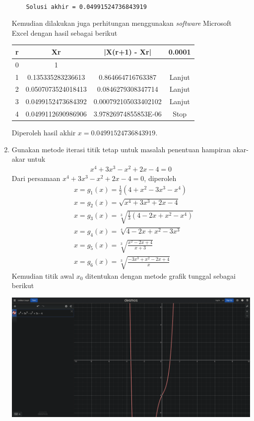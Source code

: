 \documentclass[12pt]{article}
\begin{document}
\begin{enumerate}
{\begin{lstlisting}
    
    Solusi akhir = 0.04991524736843919
        \end{lstlisting}
        Kemudian dilakukan juga perhitungan menggunakan \emph{software} Microsoft Excel dengan hasil sebagai berikut
        \begin{longtable}[c]{|c|c|c|c|}
            \hline
            r & Xr                 & |X(r+1) - Xr|        & 0.0001 \\ \hline
            \endfirsthead
            \endhead
            0 & 1                  &                      &        \\ \hline
            1 & 0.135335283236613  & 0.864664716763387    & Lanjut \\ \hline
            2 & 0.0507073524018413 & 0.0846279308347714   & Lanjut \\ \hline
            3 & 0.0499152473684392 & 0.000792105033402102 & Lanjut \\ \hline
            4 & 0.0499112690986906 & 3.97826974855853E-06 & Stop   \\ \hline
        \end{longtable}
        Diperoleh hasil akhir $ x = 0.04991524736843919 $.
    }
    \item {
        Gunakan metode iterasi titik tetap untuk masalah penentuan hampiran akar-akar untuk
        \begin{align*}
            x^4 + 3x^3 - x^2 + 2x - 4 = 0 
        \end{align*}
        Dari persamaan $ x^4 + 3x^3 - x^2 + 2x - 4 = 0 $, diperoleh
        \begin{align*}
            & x = g_1(x) = \frac{1}{2}(4 + x^2 - 3x^3 - x^4) \\
            & x = g_2(x) = \sqrt{x^4 + 3x^3 + 2x - 4} \\
            & x = g_3(x) = \sqrt[3]{\frac{1}{3}(4 - 2x + x^2 - x^4)} \\
            & x = g_4(x) = \sqrt[4]{4 - 2x + x^2 - 3x^3} \\
            & x = g_5(x) = \sqrt[3]{\frac{x^2 - 2x + 4}{x + 3}} \\
            & x = g_6(x) = \sqrt[3]{\frac{-3x^3 + x^2 - 2x + 4}{x}}
        \end{align*}
        Kemudian titik awal $ x_0 $ ditentukan dengan metode grafik tunggal sebagai berikut
        \begin{center}
            \includegraphics[scale=0.2]{gambar4.png}

\end{center}}
\end{enumerate}
\end{document}
